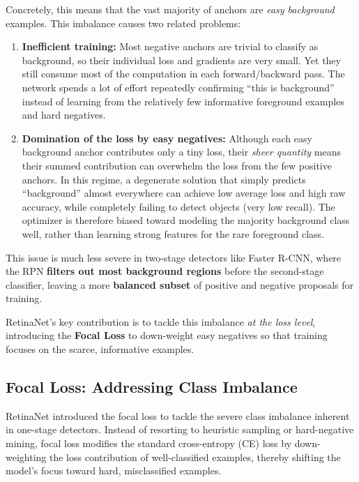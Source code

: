 Concretely, this means that the vast majority of anchors are \emph{easy background} examples. This imbalance causes two related problems:

\begin{enumerate}
	\item \textbf{Inefficient training:} Most negative anchors are trivial to classify as background, so their individual loss and gradients are very small. Yet they still consume most of the computation in each forward/backward pass. The network spends a lot of effort repeatedly confirming “this is background” instead of learning from the relatively few informative foreground examples and hard negatives.
	
	\item \textbf{Domination of the loss by easy negatives:} Although each easy background anchor contributes only a tiny loss, their \emph{sheer quantity} means their summed contribution can overwhelm the loss from the few positive anchors. In this regime, a degenerate solution that simply predicts “background” almost everywhere can achieve low average loss and high raw accuracy, while completely failing to detect objects (very low recall). The optimizer is therefore biased toward modeling the majority background class well, rather than learning strong features for the rare foreground class.
\end{enumerate}

This issue is much less severe in two-stage detectors like Faster R-CNN, where the RPN \textbf{filters out most background regions} before the second-stage classifier, leaving a more \textbf{balanced subset} of positive and negative proposals for training.

RetinaNet’s key contribution is to tackle this imbalance \emph{at the loss level}, introducing the \textbf{Focal Loss} to down-weight easy negatives so that training focuses on the scarce, informative examples.

\subsection{Focal Loss: Addressing Class Imbalance}

RetinaNet introduced the focal loss to tackle the severe class imbalance inherent in one-stage detectors. Instead of resorting to heuristic sampling or hard-negative mining, focal loss modifies the standard cross-entropy (CE) loss by down-weighting the loss contribution of well-classified examples, thereby shifting the model’s focus toward hard, misclassified examples.

